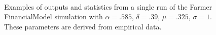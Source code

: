 \documentclass[runningheads]{llncs}
\begin{document}
\begin{figure}[htbp]
\begin{center}
{      \quad
      }
\mbox{
     }
    \caption{Examples of outputs and statistics from a single run of the Farmer FinancialModel simulation with $\alpha=.585$, $\delta=.39$, $\mu=.325$, $\sigma=1$. These parameters are derived from empirical data.}
    \label{fig:sampleDynamicsFarmer}
  \end{center}
\end{figure}
\end{document}
